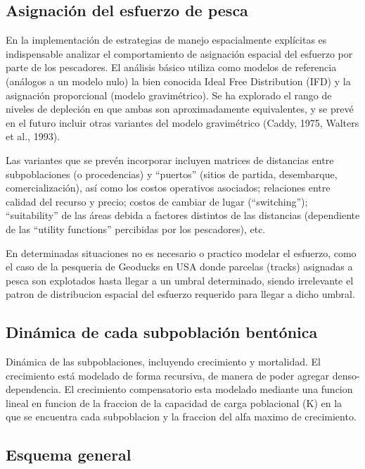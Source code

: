 		\subsection{Asignación del esfuerzo de pesca}

			En la implementación de estrategias de manejo espacialmente explícitas es indispensable analizar el comportamiento de asignación espacial del esfuerzo por parte de los pescadores. El análisis básico utiliza como modelos de referencia (análogos a un modelo nulo) la bien conocida Ideal Free Distribution (IFD) y la asignación proporcional (modelo gravimétrico). Se ha explorado el rango de niveles de depleción en que ambas son aproximadamente equivalentes, y se prevé en el futuro incluir otras variantes del modelo gravimétrico (Caddy, 1975, Walters et al., 1993).

			Las variantes que se prevén incorporar incluyen matrices de distancias entre subpoblaciones (o procedencias) y “puertos” (sitios de partida, desembarque, comercialización), así como los costos operativos asociados; relaciones entre calidad del recurso y precio; costos de cambiar de lugar (“switching”); “suitability” de las áreas debida a factores distintos de las distancias (dependiente de las “utility functions” percibidas por los pescadores), etc.

			En determinadas situaciones no es necesario o practico modelar el esfuerzo, como el caso de la pesqueria de Geoducks en USA donde parcelas (tracks) asignadas a pesca son explotados hasta llegar a un umbral determinado, siendo irrelevante el patron de distribucion espacial del esfuerzo requerido para llegar a dicho umbral.

		\subsection {Dinámica de cada subpoblación bentónica}

			Dinámica de las subpoblaciones, incluyendo crecimiento y mortalidad. El crecimiento está modelado de forma recursiva, de manera de poder agregar denso-dependencia. El crecimiento compensatorio esta modelado mediante una funcion lineal en funcion de la fraccion de la capacidad de carga poblacional (K) en la que se encuentra cada subpoblacion y la fraccion del alfa maximo de crecimiento.

		\subsection{Esquema general}
		
